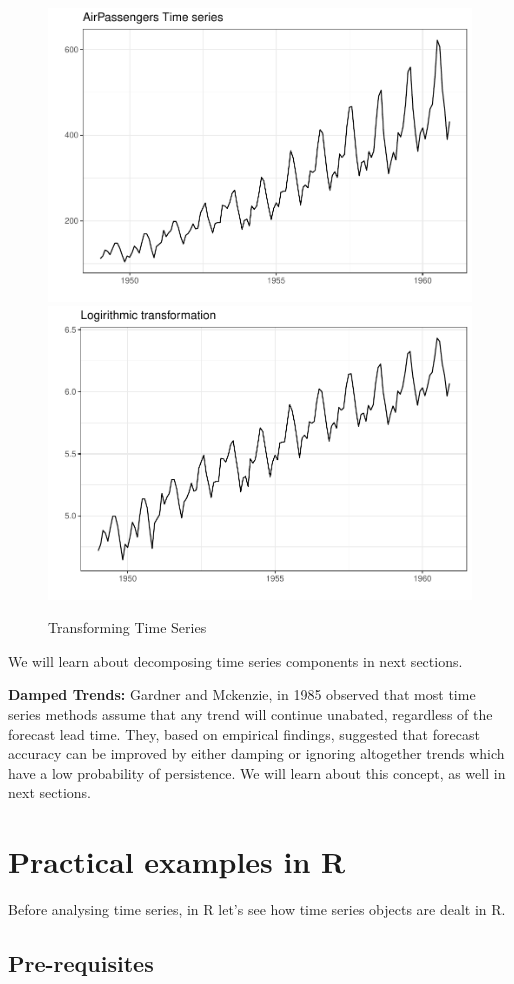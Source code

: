 \documentclass[
]{book}
\begin{document}
\begin{figure}

{\centering \includegraphics[width=0.49\linewidth]{DauR_files/figure-latex/logts-1} \includegraphics[width=0.49\linewidth]{DauR_files/figure-latex/logts-2} 

}

\caption{Transforming Time Series}\label{fig:logts}
\end{figure}

We will learn about decomposing time series components in next sections.

\textbf{Damped Trends:} Gardner and Mckenzie, in 1985 \citep{mcke} observed that most time series methods assume that any trend will continue unabated, regardless of the forecast lead time. They, based on empirical findings, suggested that forecast accuracy can be improved by either damping or ignoring altogether trends which have a low probability of persistence. We will learn about this concept, as well in next sections.

\hypertarget{practical-examples-in-r}{%
\section{Practical examples in R}\label{practical-examples-in-r}}

Before analysing time series, in R let's see how time series objects are dealt in R.

\hypertarget{pre-requisites}{%
\subsection*{Pre-requisites}\label{pre-requisites}}
\end{document}
